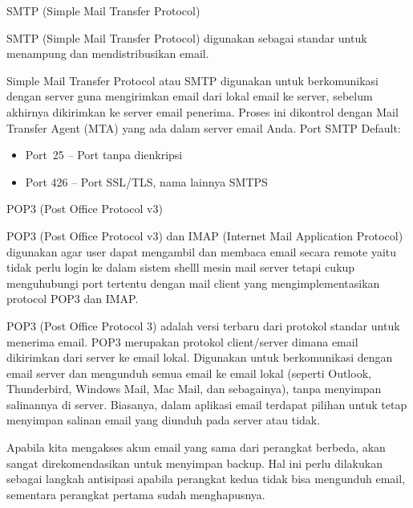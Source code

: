 \documentclass[a4paper,12pt]{report}
\begin{document}
\begin{myEnumerate}
\item SMTP (Simple Mail Transfer Protocol) \par
SMTP (Simple Mail Transfer Protocol) digunakan sebagai standar untuk menampung dan mendistribusikan email. \par
\vspace{12pt}
Simple Mail Transfer Protocol atau SMTP digunakan untuk berkomunikasi dengan server guna mengirimkan email dari lokal email ke server, sebelum akhirnya dikirimkan ke server email penerima. Proses ini dikontrol dengan Mail Transfer Agent (MTA) yang ada dalam server email Anda. Port SMTP Default: \par
\noindent 
\begin{itemize}
\item Port~25 –  Port tanpa dienkripsi \par
\noindent 
\item Port 426 – Port SSL/TLS, nama lainnya SMTPS\end{itemize}
 \par
\vspace{12pt}
\noindent 
\item POP3 (Post Office Protocol v3) \par
POP3 (Post Office Protocol v3) dan IMAP (Internet Mail Application Protocol) digunakan agar user dapat mengambil dan membaca email secara remote yaitu tidak perlu login ke dalam sistem shelll mesin mail server tetapi cukup menguhubungi port tertentu dengan mail client yang mengimplementasikan protocol POP3 dan IMAP. \par
POP3 (Post Office Protocol 3) adalah versi terbaru dari protokol standar untuk menerima email. POP3 merupakan protokol client/server dimana email dikirimkan dari server ke email lokal. Digunakan untuk berkomunikasi dengan email server dan mengunduh semua email ke email lokal (seperti Outlook, Thunderbird, Windows Mail, Mac Mail, dan sebagainya), tanpa menyimpan salinannya di server. Biasanya, dalam aplikasi email terdapat pilihan untuk tetap menyimpan salinan email yang diunduh pada server atau tidak. \par
\vspace{12pt}
Apabila kita mengakses akun email yang sama dari perangkat berbeda, akan sangat direkomendasikan untuk menyimpan backup. Hal ini perlu dilakukan sebagai langkah antisipasi apabila perangkat kedua tidak bisa mengunduh email, sementara perangkat pertama sudah menghapusnya. \par
\vspace{12pt}

\end{myEnumerate}
\end{document}
